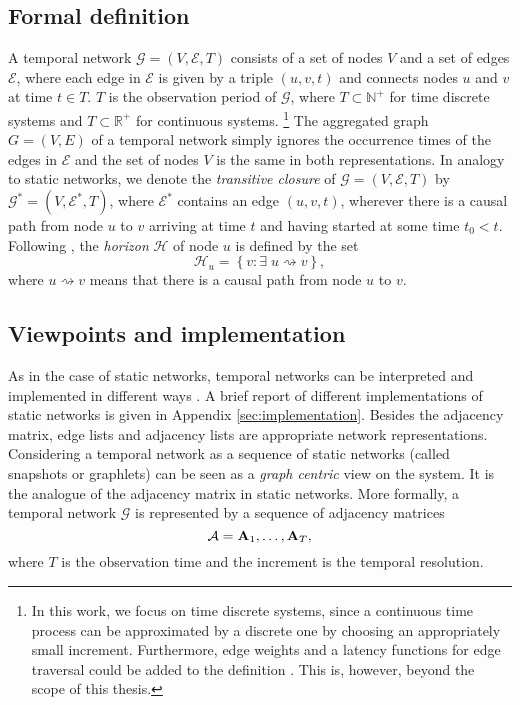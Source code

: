 \subsection{Formal definition}
A temporal network $\mathcal{G}=(V,\mathcal{E},T)$ consists of a set of nodes $V$ and a set of edges $\mathcal{E}$, where each edge in $\mathcal{E}$ is given by a triple $(u,v,t)$ and connects nodes $u$ and $v$ at time $t\in T$.
$T$ is the observation period of $\mathcal{G}$, where $T\subset \mathbb{N}^+$ for time discrete systems and $T\subset \mathbb{R}^+$ for continuous systems.
\footnote{
In this work, we focus on time discrete systems, since a continuous time process can be approximated by a discrete one by choosing an appropriately small increment.
Furthermore, edge weights and a latency functions for edge traversal could be added to the definition \citep{Casteights_review}.
This is, however, beyond the scope of this thesis.
}
The aggregated graph $G=(V,E)$ of a temporal network simply ignores the occurrence times of the edges in $\mathcal{E}$ and the set of nodes $V$ is the same in both representations.
%
In analogy to static networks, we denote the \emph{transitive closure} of $\mathcal{G}=(V,\mathcal{E},T)$ by $\mathcal{G}^*=(V,\mathcal{E}^*,T)$, where $\mathcal{E}^*$ contains an edge $(u,v,t)$, wherever there is a causal path from node $u$ to $v$ arriving at time $t$ and having started at some time $t_0<t$.
%
Following \citep{Casteights_review}, the \emph{horizon} $\mathcal{H}$ of node $u$ is defined by the set
\begin{equation}\label{eq:temporal_horizon}
\mathcal{H}_u = \left\{ v: \exists \; u\rightsquigarrow v  \right\},
\end{equation}
where $ u\rightsquigarrow v $ means that there is a causal path from node $u$ to $v$.

\subsection{Viewpoints and implementation}
As in the case of static networks, temporal networks can be interpreted and implemented in different ways \citep{Casteights_review}.
A brief report of different implementations of static networks is given in Appendix \ref{sec:implementation}.
Besides the adjacency matrix, edge lists and adjacency lists are appropriate network representations.
Considering a temporal network as a sequence of static networks (called snapshots or graphlets) can be seen as a \emph{graph centric} view on the system.
It is the analogue of the adjacency matrix in static networks.
More formally, a temporal network $\mathcal{G}$ is represented by a sequence of adjacency matrices
\begin{equation}\label{eq:AdMatrixSequence}
\mathcal{A}=\mathbf{A}_1,\dots ,\mathbf{A}_T,
\end{equation}
where $T$ is the observation time and the increment is the temporal resolution.

